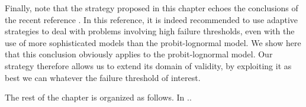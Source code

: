 













{Finally, note that the strategy proposed in this chapter echoes the conclusions of the recent reference \mbox{\cite{zhu_seismic_2023}}. In this reference, it is indeed recommended to use adaptive strategies to deal with problems involving high failure thresholds, even with the use of more sophisticated models than the probit-lognormal model. We show here that this conclusion obviously applies to the probit-lognormal model. Our strategy therefore allows us to extend its domain of validity, by exploiting it as best we can whatever the failure threshold of interest.}



The rest of the chapter is organized as follows. In ..




